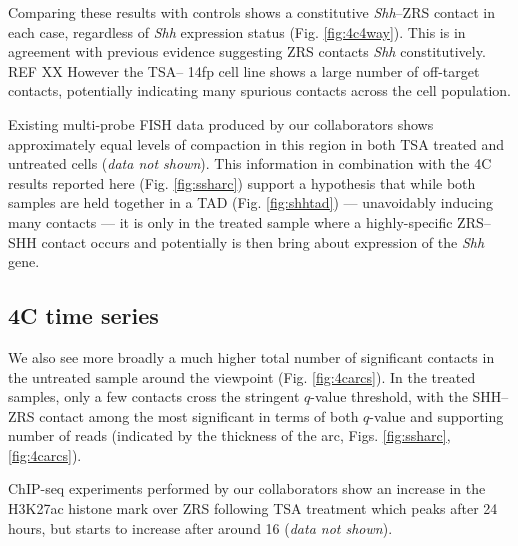 \documentclass[a4paper,11pt,oneside]{book}
\begin{document}
Comparing these results with controls shows a constitutive \emph{Shh}--ZRS contact in each case, regardless of \emph{Shh} expression status (Fig. \ref{fig:4c4way}). This is in agreement with previous evidence suggesting ZRS contacts \emph{Shh} constitutively.\cite{Bouwman2015a} REF XX However the TSA-- 14fp cell line shows a large number of off-target contacts, potentially indicating many spurious contacts across the cell population.

Existing multi-probe FISH data produced by our collaborators shows approximately equal levels of compaction in this region in both TSA treated and untreated cells (\emph{data not shown}). This information in combination with the 4C results reported here (Fig. \ref{fig:ssharc}) support a hypothesis that while both samples are held together in a TAD (Fig. \ref{fig:shhtad}) --- unavoidably inducing many contacts --- it is only in the treated sample where a highly-specific ZRS--SHH contact occurs and potentially is then bring about expression of the \emph{Shh} gene.

\subsection{4C time series}

We also see more broadly a much higher total number of significant contacts in the untreated sample around the viewpoint (Fig. \ref{fig:4carcs}). In the treated samples, only a few contacts cross the stringent $q$-value threshold, with the SHH--ZRS contact among the most significant in terms of both $q$-value and supporting number of reads (indicated by the thickness of the arc, Figs. \ref{fig:ssharc}, \ref{fig:4carcs}).

ChIP-seq experiments performed by our collaborators show an increase in the H3K27ac histone mark over ZRS following TSA treatment which peaks after 24 hours, but starts to increase after around 16 (\emph{data not shown}). 

\end{document}
